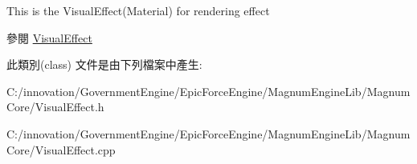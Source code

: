 This is the Visual\+Effect(\+Material) for rendering effect \begin{DoxySeeAlso}{參閱}
\hyperlink{class_i_dream_sky_1_1_visual_effect}{Visual\+Effect} 
\end{DoxySeeAlso}


此類別(class) 文件是由下列檔案中產生\+:\begin{DoxyCompactItemize}
\item 
C\+:/innovation/\+Government\+Engine/\+Epic\+Force\+Engine/\+Magnum\+Engine\+Lib/\+Magnum\+Core/Visual\+Effect.\+h\item 
C\+:/innovation/\+Government\+Engine/\+Epic\+Force\+Engine/\+Magnum\+Engine\+Lib/\+Magnum\+Core/Visual\+Effect.\+cpp\end{DoxyCompactItemize}
